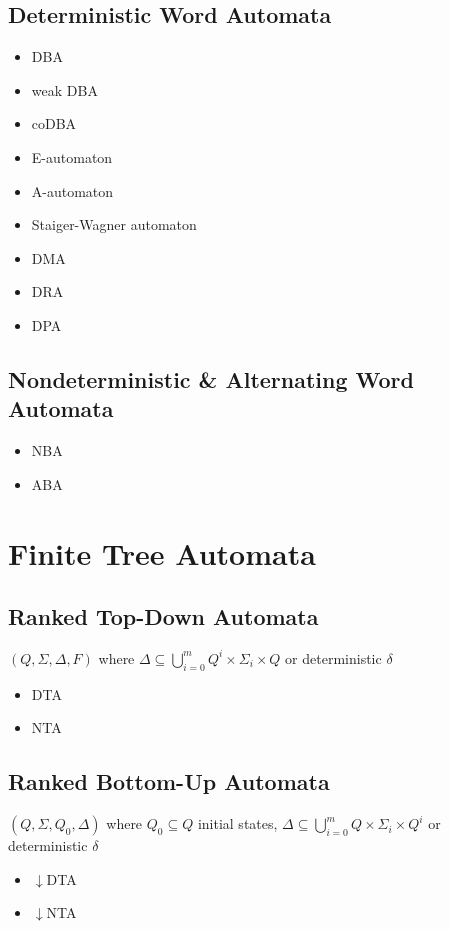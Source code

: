 \documentclass{article}
\begin{document}
\subsection{Deterministic Word Automata}
\begin{itemize}
	\item DBA
	\item weak DBA
	\item coDBA
	\item E-automaton
	\item A-automaton
	\item Staiger-Wagner automaton
	\item DMA
	\item DRA
	\item DPA
\end{itemize}

\subsection{Nondeterministic \& Alternating Word Automata}
\begin{itemize}
	\item NBA
	\item ABA
\end{itemize}



\newpage
\section{Finite Tree Automata}
\subsection{Ranked Top-Down Automata}
$(Q, \Sigma, \Delta, F)$ where $\Delta \subseteq \bigcup\limits_{i=0}^m Q^i \times \Sigma_i \times Q$ or deterministic $\delta$

\begin{itemize}
	\item DTA
	\item NTA
\end{itemize}

\subsection{Ranked Bottom-Up Automata}
$(Q, \Sigma, Q_0, \Delta)$ where $Q_0 \subseteq Q$ initial states, $\Delta \subseteq \bigcup\limits_{i=0}^m Q \times \Sigma_i \times Q^i$ or deterministic $\delta$

\begin{itemize}
	\item $\downarrow$DTA
	\item $\downarrow$NTA
\end{itemize}
\end{document}
